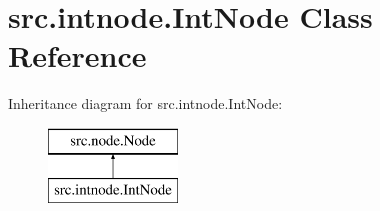 \hypertarget{classsrc_1_1intnode_1_1IntNode}{}\section{src.\+intnode.\+Int\+Node Class Reference}
\label{classsrc_1_1intnode_1_1IntNode}
Inheritance diagram for src.\+intnode.\+Int\+Node\+:\begin{figure}[H]
\begin{center}
\leavevmode
\includegraphics[height=2.000000cm]{classsrc_1_1intnode_1_1IntNode}
\end{center}
\end{figure}

